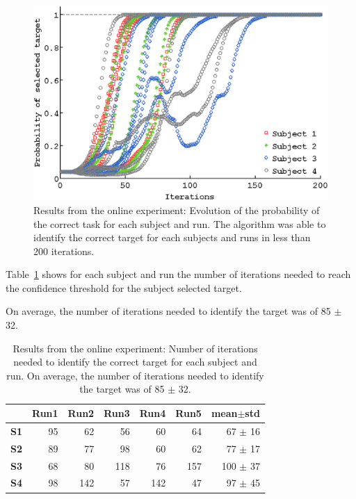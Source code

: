 \documentclass[letterpaper]{article}
\newcommand{\ww}{0.9}
\begin{document}
\begin{figure}[!htbp]
    \centering
    \includegraphics[width=\ww\columnwidth]{img/plot_realevolution}    
    \caption{Results from the online experiment: Evolution of the probability of the correct task for each subject and run. The algorithm was able to identify the correct target for each subjects and runs in less than 200 iterations.}
    \label{fig:online_results} 
\end{figure}

Table~\ref{ch6tab:steps} shows for each subject and run the number of iterations needed to reach the confidence threshold for the subject selected target.

On average, the number of iterations needed to identify the target was of 85 $\pm$ 32.

\begin{table}[!ht]
\centering
\begin{footnotesize}
\begin{tabular}{r|rrrrr|r}
    & \textbf{Run1} & \textbf{Run2} & \textbf{Run3} & \textbf{Run4} & \textbf{Run5} & \textbf{mean$\pm$std} \\\hline
    \textbf{S1} & 95 & 62 & 56 & 60 & 64 & 67 $\pm$ 16 \\
    \textbf{S2} & 89 & 77 & 98 & 60 & 62  & 77 $\pm$ 17 \\
    \textbf{S3} & 68 & 80 & 118 & 76 & 157 & 100 $\pm$ 37 \\
    \textbf{S4} & 98 & 142 & 57 & 142 & 47 & 97 $\pm$ 45 \\
\end{tabular}
\end{footnotesize}
  \caption{Results from the online experiment: Number of iterations needed to identify the correct target for each subject and run. On average, the number of iterations needed to identify the target was of 85 $\pm$ 32.}
  \label{ch6tab:steps}
\end{table}
\end{document}
